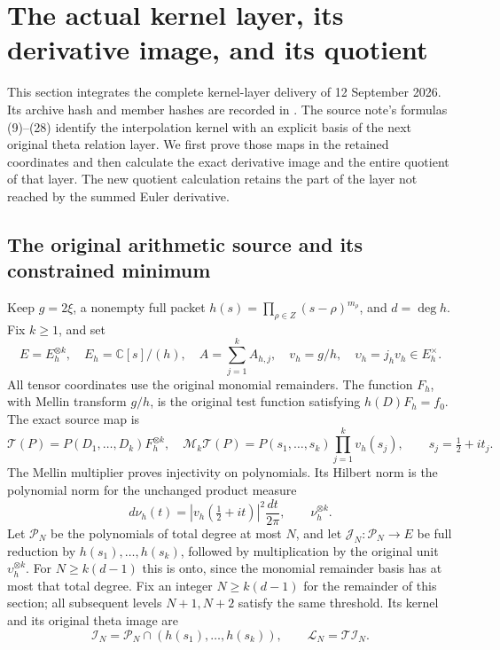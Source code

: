 \section{The actual kernel layer, its derivative image, and its quotient}
\label{sec:kernel-layer-continuation}

This section integrates the complete kernel-layer delivery of
12 September 2026.  Its archive hash and member hashes are recorded in
.
The source note's formulas (9)--(28) identify the interpolation kernel
with an explicit basis of the next original theta relation layer.
We first prove those maps in the retained coordinates and then calculate
the exact derivative image and the entire quotient of that layer.
The new quotient calculation retains the part of the layer not reached
by the summed Euler derivative.

\subsection{The original arithmetic source and its constrained minimum}

Keep \(g=2\xi\), a nonempty full packet
\(h(s)=\prod_{\rho\in Z}(s-\rho)^{m_\rho}\), and
\(d=\deg h\).  Fix \(k\geq1\), and set
\[
 E=E_h^{\otimes k},\quad E_h=\mathbb C[s]/(h),\quad
 A=\sum_{j=1}^k A_{h,j},\quad
 v_h=g/h,\quad \upsilon_h=j_hv_h\in E_h^\times.
                                                               \tag{KL.1}
\]
All tensor coordinates use the original monomial remainders.  The
function \(F_h\), with Mellin transform \(g/h\), is the original
test function satisfying \(h(D)F_h=f_0\).  The exact source map is
\[
 \mathcal T(P)=P(D_1,\ldots,D_k)F_h^{\otimes k},\quad
 \mathcal M_k\mathcal T(P)
       =P(s_1,\ldots,s_k)\prod_{j=1}^k v_h(s_j),
 \qquad s_j=\tfrac12+it_j.                                \tag{KL.2}
\]
The Mellin multiplier proves injectivity on polynomials.  Its Hilbert
norm is the polynomial norm for the unchanged product measure
\[
 d\nu_h(t)=|v_h(\tfrac12+it)|^2\frac{dt}{2\pi},\qquad
 \nu_h^{\otimes k}.                                      \tag{KL.3}
\]
Let \(\mathcal P_N\) be the polynomials of total degree at most
\(N\), and let \(\mathcal J_N:\mathcal P_N\to E\) be full
reduction by \(h(s_1),\ldots,h(s_k)\), followed by multiplication
by the original unit \(\upsilon_h^{\otimes k}\).
For \(N\geq k(d-1)\) this is onto, since the monomial remainder
basis has at most that total degree.  Fix an integer
\(N\geq k(d-1)\) for the remainder of this section; all subsequent
levels \(N+1,N+2\) satisfy the same threshold.
Its kernel and its original
theta image are
\[
 \mathcal I_N=\mathcal P_N\cap(h(s_1),\ldots,h(s_k)),
 \qquad \mathcal L_N=\mathcal T\mathcal I_N.              \tag{KL.4}
\]

